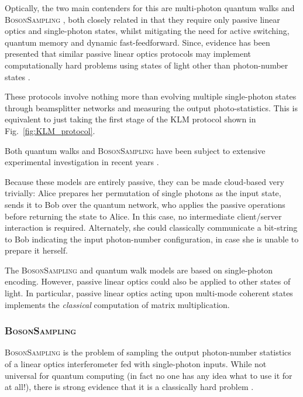 Optically, the two main contenders for this are multi-photon quantum walks \cite{bib:Aharonov93, bib:Aharonov01, bib:Kempe03, bib:Childs09, bib:Salvador12, bib:RohdeMultiWalk11} and \textsc{BosonSampling} \cite{bib:AaronsonArkhipov10, bib:RohdeIntroBS15}, both closely related in that they require only passive linear optics and single-photon states, whilst mitigating the need for active switching, quantum memory and dynamic fast-feedforward. Since, evidence has been presented that similar passive linear optics protocols may implement computationally hard problems using states of light other than photon-number states \cite{bib:RandBS, bib:RohdePhotAdd15, bib:RohdeDisp15, bib:RohdeCat15}.

These protocols involve nothing more than evolving multiple single-photon states through beamsplitter networks and measuring the output photo-statistics. This is equivalent to just taking the first stage of the KLM protocol shown in Fig.~\ref{fig:KLM_protocol}.

Both quantum walks and \textsc{BosonSampling} have been subject to extensive experimental investigation in recent years \cite{bib:PeruzzoQW, bib:Broome10, bib:Schreiber11b, bib:Owens11, bib:RohdeQWExp12, bib:Broome2012, bib:RohdeQWExp12, bib:Spring2, bib:Crespi3, bib:Tillmann4}.

Because these models are entirely passive, they can be made cloud-based very trivially: Alice prepares her permutation of single photons as the input state, sends it to Bob over the quantum network, who applies the passive operations before returning the state to Alice. In this case, no intermediate client/server interaction is required. Alternately, she could classically communicate a bit-string to Bob indicating the input photon-number configuration, in case she is unable to prepare it herself.

The \textsc{BosonSampling} and quantum walk models are based on single-photon encoding. However, passive linear optics could also be applied to other states of light. In particular, passive linear optics acting upon multi-mode coherent states implements the \textit{classical} computation of matrix multiplication.

%
%

\subsubsection{\textsc{BosonSampling}} \label{sec:BS} 

\textsc{BosonSampling} is the problem of sampling the output photon-number statistics of a linear optics interferometer fed with single-photon inputs. While not universal for quantum computing (in fact no one has any idea what to use it for at all!), there is strong evidence that it is a classically hard problem \cite{bib:AaronsonArkhipov10, bib:RohdeIntroBS15}.

